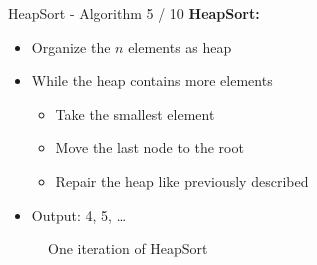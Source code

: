 \begin{frame}{HeapSort - Algorithm 5 / 10}
  \textbf{HeapSort:}
  \begin{itemize}
    \item
      Organize the {\color{MainA}$n$} elements as heap
    \item
      While the heap contains more elements
      \begin{itemize}
        \item
          Take the smallest element
        \item
          Move the last node to the root
        \item
          Repair the heap like previously described
      \end{itemize}
    \item
      Output: {\color{MainB}4}, {\color{MainB}5},
      {\color{MainB}\ldots}
  \end{itemize}
  \vspace*{-0.5em}
  \begin{center}
    \begin{figure}[!h]%
      \begin{columns}%
        \begin{column}{0.33\textwidth}%
          \begin{centering}
            \begin{adjustbox}{height=8em}
            \end{adjustbox}%
          \end{centering}
        \end{column}%
        \begin{column}{0.33\textwidth}%
          \begin{centering}
            \begin{adjustbox}{height=8em}
            \end{adjustbox}%
          \end{centering}
        \end{column}%
        \begin{column}{0.33\textwidth}%
          \begin{centering}
            \begin{adjustbox}{height=8em}
            \end{adjustbox}%
          \end{centering}
        \end{column}%
      \end{columns}%
      \caption{One iteration of HeapSort}%
      \label{fig:heapsort_repair}%
    \end{figure}
  \end{center}
\end{frame}

